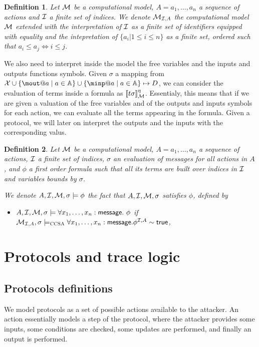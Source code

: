 \documentclass[a4paper]{article}
\newtheorem{definition}{Definition}
\theoremstyle{remark}
\begin{document}
\begin{definition}
Let $\mathcal{M}$ be a computational model, $A = a_1,\dots, a_n$  a sequence of actions and $\mathcal{I}$ a finite set of indices. We denote $\mathcal{M}_{\mathcal{I},A}$ the computational model $\mathcal{M}$ extended with the interpretation of $\mathcal{I}$ as a finite set of identifiers equipped with equality and the intepretation of $\{a_i | 1 \leq i \leq n\}$ as a finite set, ordered such that $a_i \leq a_j \Leftrightarrow i\leq j$.
\end{definition}


We also need to interpret inside the \BC model the free variables and the inputs and outputs functions symbols. Given $\sigma$ a mapping from $\X \cup \{\mout@a \mid a \in \Actions \} \cup \{\minp@a \mid a \in \Actions \} \mapsto D$, we can consider the evaluation of terms inside a formula as $[\![t\sigma]\!]_{\mathcal{M}}^\eta$. Essentialy, this means that if we are given a valuation of the free variables and of the outputs and inputs symbols for each action, we can evaluate all the terms appearing in the formula. Given a protocol, we will later on interpret the outputs and the inputs with the corresponding valus.


\begin{definition}
Let $\mathcal{M}$ be a computational model, $A = a_1,\dots, a_n$  a sequence of actions, $\mathcal{I}$ a finite set of indices, $\sigma$ an evaluation of messages for all actions in $A$, and $\phi$ a first order formula such that all its terms are built over indices in $\mathcal{I}$ and variables bounds by $\sigma$.


  We denote $A,\mathcal{I},\mathcal{M},\sigma \models \phi$ the fact that $A,\mathcal{I},\mathcal{M},\sigma$ satisfies $\phi$, defined by
  \begin{itemize}
  \item $A,\mathcal{I},\mathcal{M},\sigma \models \forall x_1,\dots,x_n : \textsf{message}.\ \phi $ if $\mathcal{M}_{\mathcal{I},A}, \sigma \models_\textsc{CCSA} \forall x_1,\dots,x_n : \textsf{message}. \phi^{\mathcal{I},A} \sim \textsf{true}$,
  \end{itemize}
\end{definition}



\section{Protocols and trace logic}


\subsection{Protocols definitions}
We  model protocols as a set of possible actions available to the
attacker. An action essentially models a step of the protocol, where
the attacker provides some inputs, some conditions are checked, some
updates are performed, and finally an output is performed.
\end{document}
